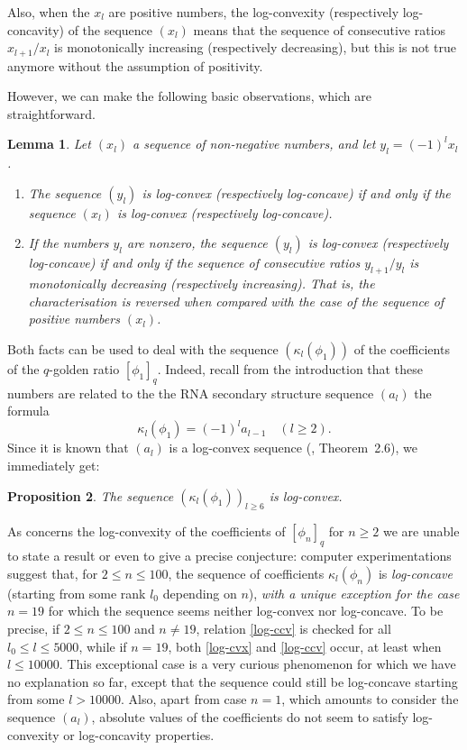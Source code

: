 \documentclass[11pt,reqno]{amsart}
\theoremstyle{plain}
\newtheorem{lemme}{Lemma}[section]
\newtheorem{proposition}[lemme]{Proposition}
\theoremstyle{definition}
\numberwithin{figure}{section}
\numberwithin{table}{section}
\numberwithin{equation}{section}
\newcommand\ka{\kappa}
\begin{document}
Also, when the $x_l$ are positive numbers, the log-convexity (respectively log-concavity) of the sequence $(x_l)$ means that the sequence of consecutive ratios $x_{l+1}/x_l$ is monotonically increasing (respectively decreasing), but this is not true anymore without the assumption of positivity.

However, we can make the following basic observations, which are straightforward.

\begin{lemme} Let $(x_l)$ a sequence of non-negative numbers, and let $y_l=(-1)^l x_l$.
\begin{enumerate}
\item The sequence $(y_l)$ is log-convex (respectively log-concave) if and only if the sequence $(x_l)$ is log-convex (respectively log-concave).
\item If the numbers $y_l$ are  nonzero, the sequence $(y_l)$ is log-convex (respectively log-concave) if and only if the sequence of consecutive ratios $y_{l+1}/y_l$ is monotonically decreasing (respectively increasing). That is, the characterisation  is reversed when compared with the case of the sequence of positive numbers $(x_l)$.
\end{enumerate}
\end{lemme}

Both facts can be used to deal with the sequence $(\ka_l(\phi_1))$ of the coefficients  of the $q$-golden ratio $[\phi_1]_q$. Indeed, recall from the introduction that these numbers are related to the the RNA secondary structure sequence $(a_l)$ the formula
\begin{equation*}
\ka_l(\phi_1)=(-1)^l a_{l-1}\quad (l≥2).
\end{equation*}
Since it is known that $(a_l)$ is a log-convex sequence (\cite{DSV04}, Theorem~2.6), we immediately get:

\begin{proposition}
The sequence $(\ka_l(\phi_1))_{l≥6}$ is log-convex.
\end{proposition}

As concerns the log-convexity of the coefficients of $[\phi_n]_q$ for $n≥2$ we are unable to state a result or even to give a precise conjecture: computer experimentations suggest that, for $2≤n≤100$, the sequence of coefficients $\ka_l(\phi_n)$ is \emph{log-concave} (starting from  some rank $l_0$ depending on $n$), \emph{with a unique exception for the case $n=19$} for which the sequence seems neither log-convex nor log-concave. To be precise, if $2≤n≤100$ and $n\not=19$, relation \eqref{log-ccv} is checked for all $l_0≤l≤5000$, while if $n=19$, both \eqref{log-cvx} and \eqref{log-ccv} occur, at least when $l≤10000$. This exceptional case is a very curious phenomenon for which we have no explanation so far, except that the sequence could still be  log-concave starting from some $l>10000$.
Also, apart from case $n=1$, which amounts to consider the sequence $(a_l)$,  absolute values of the coefficients do not seem to satisfy log-convexity or log-concavity properties. 
\end{document}
